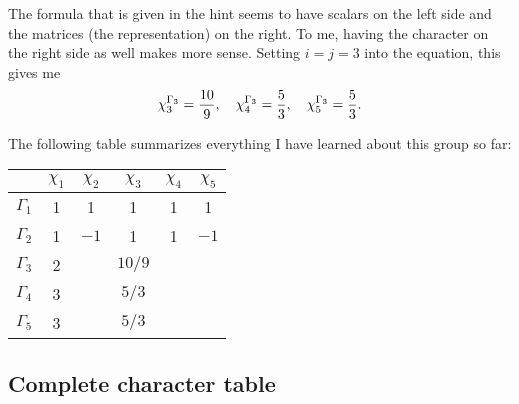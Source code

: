 \documentclass[11pt, english, fleqn, DIV=15, headinclude, BCOR=1cm]{scrartcl}
\begin{document}
The formula that is given in the hint seems to have scalars on the left side
and the matrices (the representation) on the right. To me, having the character
on the right side as well makes more sense. Setting $i = j = 3$ into the
equation, this gives me
\[
    \chi^{\Gamma_3}_3 = \frac{10}{9}
    ,\quad
    \chi^{\Gamma_3}_4 = \frac{5}{3}
    ,\quad
    \chi^{\Gamma_3}_5 = \frac{5}{3}.
\]

The following table summarizes everything I have learned about this group so
far:

\begin{tabular}{c|ccccc}
    & $\chi_1$ & $\chi_2$ & $\chi_3$ & $\chi_4$ & $\chi_5$ \\
    \midrule
    $\Gamma_1$ & 1 & 1 & 1 & 1 & 1 \\
    $\Gamma_2$ & 1 & $-1$ & 1 & 1 & $-1$ \\
    $\Gamma_3$ & 2 & & $10/9$ & & \\
    $\Gamma_4$ & 3 & & $5/3$ & & \\
    $\Gamma_5$ & 3 & & $5/3$ & & \\
\end{tabular}

\subsection{Complete character table}
\end{document}
